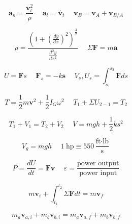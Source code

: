 \documentclass[twocolumn, 12pt]{article}
\begin{document}
\begin{equation*}
    \textbf{a}_n = \frac{\textbf{v}_t^2}{\rho} \hspace{15pt} \textbf{a}_t = \dot{\textbf{v}_t} \hspace{15pt}              \textbf{v}_B = \textbf{v}_A + \textbf{v}_{B/A}
\end{equation*}

\begin{equation*}
    \rho= \frac{(1+(\frac{dy}{dx})^2)^\frac{3}{2}}   {\frac{d^2y}{dx^2}} \hspace{15pt} \Sigma\textbf{F} = m\textbf{a}
\end{equation*}


\begin{equation*}
     U=\textbf{F}s \hspace{15pt} \textbf{F}_s=-k\textbf{s} \hspace{15pt} V_s,U_s = \int_{s_1}^{s_2} \textbf{F}ds
\end{equation*}

\begin{equation*}
    T=\frac{1}{2}m\textbf{v}^2+\frac{1}{2}I_G\omega^2   \hspace{15pt}  T_1+\Sigma U_{2-1}= T_2
\end{equation*}

\begin{equation*}
    T_1+V_1=T_2+V_2 \hspace{15pt} V= mgh + \frac{1}{2}ks^2
\end{equation*}

\begin{equation*}
      V_g=mgh  \hspace{15pt}   1\hspace{3pt} \text{hp} \equiv 550\frac{\text{ft}\cdot \text{lb} }{\text{s}}
\end{equation*}

\begin{equation*}
    P=\frac{dU}{dt}=\textbf{Fv}   \hspace{15pt}  \varepsilon =\frac{\text{power output}}{\text{power input}}
\end{equation*}

\begin{equation*}
    m\textbf{v}_i +\int_{t_1}^{t_2} \Sigma \textbf{F}dt = m\textbf{v}_f
\end{equation*}

\begin{equation*}
    m_a\textbf{v}_{a,i}+m_b\textbf{v}_{b,i}=m_a\textbf{v}_{a,f}+m_b\textbf{v}_{b,f}
\end{equation*}
\end{document}
